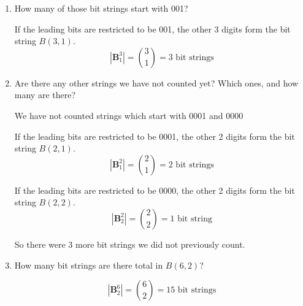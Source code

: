 \documentclass[11pt, letterpaper, includehead]{article}
\theoremstyle{plain}
\theoremstyle{mydefinition}
\theoremstyle{myproperty}
\begin{document}
\begin{enumerate}[label=\textbf{\arabic*}., leftmargin=*]
\begin{enumerate}[label=(\alph*)]
    \item How many of those bit strings start with 001?
    
    If the leading bits are restricted to be 001, the other 3 digits form the bit string $B(3, 1)$.
    \[|\mathbf{B}_1^3| = {3 \choose 1} = 3 \text{ bit strings}\]

    \item Are there any other strings we have not counted yet? Which ones, and how many are there?
    
    We have not counted strings which start with 0001 and 0000
    
    If the leading bits are restricted to be 0001, the other 2 digits form the bit string $B(2, 1)$.
    \[|\mathbf{B}_1^2| = {2 \choose 1} = 2 \text{ bit strings}\]

    If the leading bits are restricted to be 0000, the other 2 digits form the bit string $B(2, 2)$.
    \[|\mathbf{B}_2^2| = {2 \choose 2} = 1 \text{ bit string}\]

    So there were 3 more bit strings we did not previously count.

    \item How many bit strings are there total in $B(6,2)$?

    \[|\mathbf{B}_2^6| = {6 \choose 2} = 15 \text{ bit strings}\]
\end{enumerate}
\end{enumerate}
\end{document}
